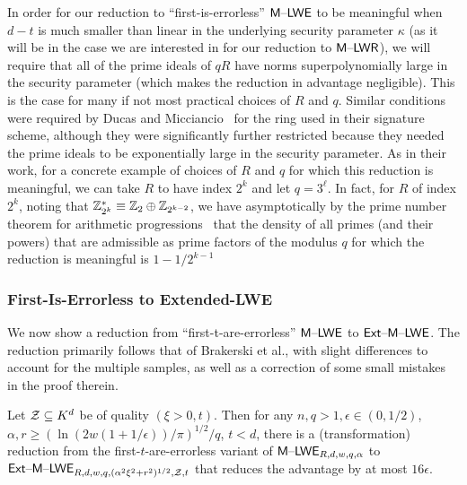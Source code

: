 In order for our reduction to ``first-is-errorless'' $\mathsf{M \text{\textendash} LWE}$ to be
meaningful when $d-t$ is much smaller than linear in the underlying
security parameter $\kappa$ (as it will be in the case we are
interested in for our reduction to $\mathsf{M \text{\textendash} LWR}$), we will require that all
of the prime ideals of $qR$ have norms superpolynomially large in the
security parameter (which makes the reduction in advantage
negligible). This is the case for many if not most practical choices
of $R$ and $q$. Similar conditions were required by Ducas and
Micciancio~\cite{DBLP:conf/crypto/DucasM14} for the ring used in their
signature scheme, although they were significantly further restricted
because they needed the prime ideals to be exponentially large in the
security parameter. As in their work, for a concrete example of
choices of $R$ and $q$ for which this reduction is meaningful, we can
take $R$ to have index $2^{k}$ and let $q=3^{\ell}$. In fact, for $R$
of index $2^{k}$, noting that $\mathbb{Z}_{2^k}^* \equiv \mathbb{Z}_2 \oplus
\mathbb{Z}_{2^{k-2}}$, we have asymptotically by the prime number theorem for
arithmetic progressions~\cite{soprounov2010short} that the density
of all primes (and their powers) that are admissible as prime factors of
the modulus $q$ for which the reduction is meaningful is $1-1/2^{k-1}$

\subsubsection{First-Is-Errorless to Extended-LWE}
\label{sec:first-errorl-extend}

We now show a reduction from ``first-t-are-errorless'' $\mathsf{M \text{\textendash} LWE}$ to
$\mathsf{Ext \text{\textendash} M \text{\textendash} LWE}$. The reduction primarily follows that of Brakerski et al.,
with slight differences to account for the multiple samples, as well
as a correction of some small mistakes in the proof therein. 
\begin{lemma}
Let $\mathcal{Z} \subseteq K^d$ be of quality $(\xi > 0,t)$. Then for any $n, q
> 1, \epsilon \in (0,1/2)$, $\alpha, r \geq
(\ln(2w(1+1/\epsilon))/\pi)^{1/2}/q$, $t < d$, there is a (transformation)
reduction from the first-$t$-are-errorless variant of
$\mathsf{M \text{\textendash} LWE}_{R,d,w,q,\alpha}$ to
\\$\mathsf{Ext \text{\textendash} M \text{\textendash} LWE}_{R,d,w,q,(\alpha^2\xi^2+r^2)^{1/2},\mathcal{Z},t}$ that reduces
the advantage by at most $16\epsilon$. 
\end{lemma}

